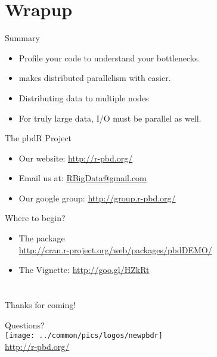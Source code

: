 \section{Wrapup}
\makesubcontentsslides
\hidenum

\begin{frame}
  \begin{block}{Summary}
    \begin{itemize}
      \item Profile your code to understand your bottlenecks.
      \item \pbdR makes distributed parallelism with \R easier.
      \item Distributing data to multiple nodes 
      \item For truly large data, I/O must be parallel as well.
    \end{itemize}
  \end{block}
\end{frame}


\begin{frame}[noframenumbering]
  \begin{block}{The pbdR Project}
    \begin{itemize}
      \item Our website: \url{http://r-pbd.org/}
      \item Email us at: \url{RBigData@gmail.com}
      \item Our google group: \url{http://group.r-pbd.org/}
     \end{itemize}
\end{block}
  \begin{block}{Where to begin?}
    \begin{itemize}
      \item The  package\\
      \url{http://cran.r-project.org/web/packages/pbdDEMO/}\\
      \item The  Vignette: \url{http://goo.gl/HZkRt}
    \end{itemize}
\end{block}
\end{frame}


\section*{}



\begin{frame}[noframenumbering]
 \begin{block}{Thanks for coming!}
 \begin{center}
 \vspace{.4cm}
     {\Huge Questions?}\\[.8cm]
\texttt{[image: ../common/pics/logos/newpbdr]}
\\[.1cm]
\url{http://r-pbd.org/}
  \end{center}
 \end{block}
\end{frame}
